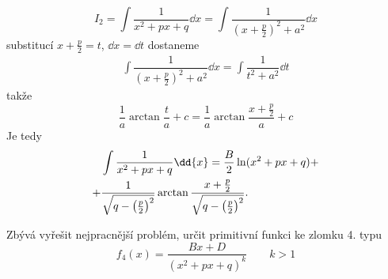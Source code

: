       \begin{equation}
        I_2 =\int\dfrac{1}{x^2+px+q}\dd{x} 
            =\int{\dfrac{1}{\left(x+\frac{p}{2}\right)^2 + a^2}}\dd{x}
      \end{equation}
      substitucí \(x + \frac{p}{2} = t\), \(\dd{x} = \dd{t}\) dostaneme 
      \begin{gather*}
        \int{\dfrac{1}{\left(x+\frac{p}{2}\right)^2 + a^2}}\dd{x} = 
        \int{\dfrac{1}{t^2+a^2}}\dd{t}
      \end{gather*}
      takže
      \begin{equation*}
        \dfrac{1}{a}\arctan\dfrac{t}{a} + c = \dfrac{1}{a}\arctan\dfrac{x + \frac{p}{2}}{a} + c 
      \end{equation*}
      Je tedy
      \begin{align}
          &\int\dfrac{1}{x^2+px+q}\dd{x} = \frac{B}{2}\ln(x^2+px+q) +              \notag     \\ 
        + &\frac{1}{\sqrt{q-\left(\frac{p}{2}\right)^2}}
                \arctan\frac{x+\frac{p}{2}}{\sqrt{q-\left(\frac{p}{2}\right)^2}}.  \label{mai:eq171}
      \end{align}
     
      

      Zbývá vyřešit nejpracnější problém, určit primitivní funkci ke zlomku 4. typu 
        \begin{equation}\label{mai:eq172}
          \boxed{f_4(x) = \frac{Bx + D}{(x^2+px+q)^k}} \qquad k>1
        \end{equation}
      
